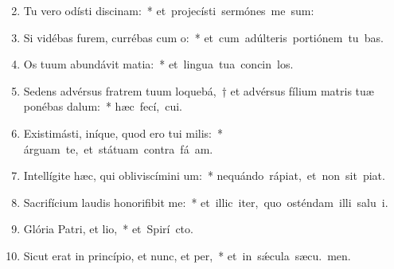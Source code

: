 \begin{flushleft}
\begin{enumerate}[leftmargin=*]
\setcounter{enumi}{1}

\item Tu vero odísti discinam:~* \mbox{et projecísti sermónes me sum:}
\item Si vidébas furem, currébas cum o:~* \mbox{et cum adúlteris portiónem tu bas.}
\item Os tuum abundávit matia:~* \mbox{et lingua tua concin los.}
\item Sedens advérsus fratrem tuum loquebá,~† et advérsus fílium matris tuæ ponébas dalum:~* \mbox{hæc fecí,  cui.}
\item Existimásti, iníque, quod ero tui milis:~* \mbox{árguam te, et státuam contra fá am.}
\item Intellígite hæc, qui obliviscímini um:~* \mbox{nequándo rápiat, et non sit  piat.}
\item Sacrifícium laudis honorifibit me:~* \mbox{et illic iter, quo osténdam illi salu i.}
\item Glória Patri, et lio,~* \mbox{et Spirí cto.}
\item Sicut erat in princípio, et nunc, et per,~* \mbox{et in s\'{\ae}cula sæcu. men.}

\end{enumerate}
\end{flushleft}

